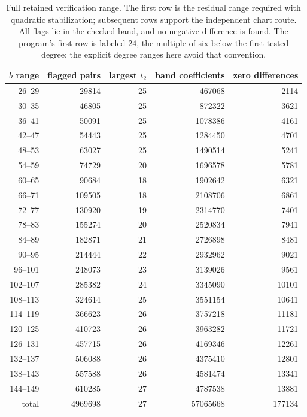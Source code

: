 \begin{table}[ht]
\centering
\begin{tabular}{r|r|r|r|r}
\(b\) range&flagged pairs&largest \(t_2\)&band coefficients&zero differences\\ \hline
26--29&29814&25&467068&2114\\
30--35&46805&25&872322&3621\\
36--41&50091&25&1078386&4161\\
42--47&54443&25&1284450&4701\\
48--53&63027&25&1490514&5241\\
54--59&74729&20&1696578&5781\\
60--65&90684&18&1902642&6321\\
66--71&109505&18&2108706&6861\\
72--77&130920&19&2314770&7401\\
78--83&155274&20&2520834&7941\\
84--89&182871&21&2726898&8481\\
90--95&214444&22&2932962&9021\\
96--101&248073&23&3139026&9561\\
102--107&285382&24&3345090&10101\\
108--113&324614&25&3551154&10641\\
114--119&366623&26&3757218&11181\\
120--125&410723&26&3963282&11721\\
126--131&457715&26&4169346&12261\\
132--137&506088&26&4375410&12801\\
138--143&557588&26&4581474&13341\\
144--149&610285&27&4787538&13881\\ \hline
total&4969698&27&57065668&177134
\end{tabular}
\caption{Full retained verification range. The first row is the residual
range required with quadratic stabilization; subsequent rows support the
independent chart route. All flags lie in the checked band, and no
negative difference is found. The program's first row is labeled \(24\), the
multiple of six below the first tested degree; the explicit degree
ranges here avoid that convention.}\label{tab:band}
\end{table}

